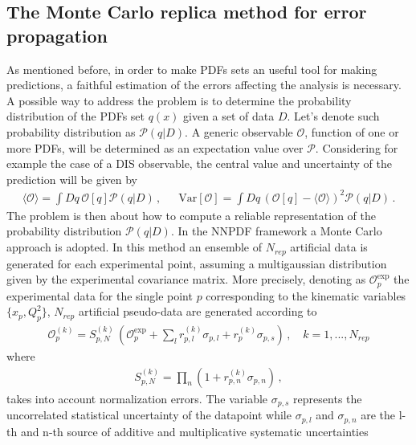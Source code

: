 \subsection{The Monte Carlo replica method for error propagation}
As mentioned before, in order to make PDFs sets an useful tool for making predictions,
a faithful estimation of the errors affecting the analysis is necessary. A possible way
to address the problem is to determine the probability distribution of the PDFs set $q\left(x\right)$
given a set of data $D$. Let's denote such probability distribution as $\mathcal{P}\left(q|D\right)$.
A generic observable $\mathcal{O}$, function of one or more PDFs, will be determined as an expectation value
over $\mathcal{P}$. Considering for example the case of a DIS observable, the central value and 
uncertainty of the prediction will be given by 
\begin{align}
    \label{eq:expectation_value_observable}
    \langle \mathcal{O}\rangle = \int Dq\, \mathcal{O}\left[q\right] \mathcal{P}\left(q|D\right)\,,\,\,\,\,\,\,\,\,\,
    \text{Var}\left[\mathcal{O}\right] = 
    \int Dq\, \left(\mathcal{O}\left[q\right] - \langle\mathcal{O}\rangle\right)^2
    \mathcal{P}\left(q|D\right)\,.
\end{align}
The problem is then about how to compute a reliable representation of the probability distribution
$\mathcal{P}\left(q|D\right)$.
In the NNPDF framework a Monte Carlo approach is adopted. In this method an ensemble of $N_{rep}$ artificial data is generated
for each experimental point, assuming a multigaussian distribution given by the experimental
covariance matrix. 
More precisely, denoting as $\mathcal{O}^{\text{exp}}_p$ the experimental data for the single point $p$ 
corresponding to the kinematic variables $\{x_p,Q_p^2\}$, 
$N_{rep}$ artificial pseudo-data are generated according to~\cite{Ball:2008by}
\begin{align}
    \mathcal{O}^{(k)}_p = 
    S_{p,N}^{(k)}\,\left(\mathcal{O}^{\text{exp}}_p+\sum_{l}r_{p,l}^{(k)}\sigma_{p,l} + r_{p}^{(k)}\sigma_{p, s} \right)\,,
    \,\,\,\,\,\,k = 1,..., N_{rep}
\end{align} 
where
\begin{align}
    S_{p,N}^{(k)} = \prod_{n}\left(1 + r_{p,n}^{(k)}\sigma_{p,n}\right)\,,
\end{align}
takes into account normalization errors. 
The variable $\sigma_{p, s}$ represents the uncorrelated statistical uncertainty of the datapoint while 
$\sigma_{p, l}$ and $\sigma_{p, n}$ are the l-th and n-th source of additive and multiplicative systematic uncertainties
